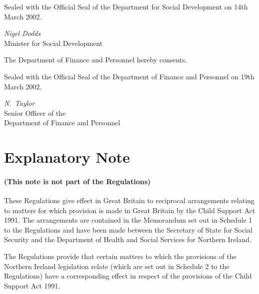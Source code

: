 \documentclass[12pt,a4paper]{article}
\begin{document}
\bigskip

Sealed with the Official Seal of the Department for Social Development on 14th March 2002.

{\raggedleft
\emph{Nigel Dodds}\\
Minister for Social Development

}

\bigskip

The Department of Finance and Personnel hereby consents.

Sealed with the Official Seal of the Department of Finance and Personnel on 19th March 2002.

{\raggedleft
\emph{N.~Taylor}\\
Senior Officer of the\\
Department of Finance and Personnel

}

\part{Explanatory Note}

\renewcommand\parthead{--- Explanatory Note}

\subsection*{(This note is not part of the Regulations)}

 These Regulations give effect in Great Britain to reciprocal arrangements relating to matters for which provision is made in Great Britain by the Child Support Act 1991. The arrangements are contained in the Memorandum set out in Schedule 1 to the Regulations and have been made between the Secretary of State for Social Security and the Department of Health and Social Services for Northern Ireland.

  The Regulations provide that certain matters to which the provisions of the Northern Ireland legislation relate (which are set out in Schedule 2 to the Regulations) have a corresponding effect in respect of the provisions of the Child Support Act 1991.
\end{document}
